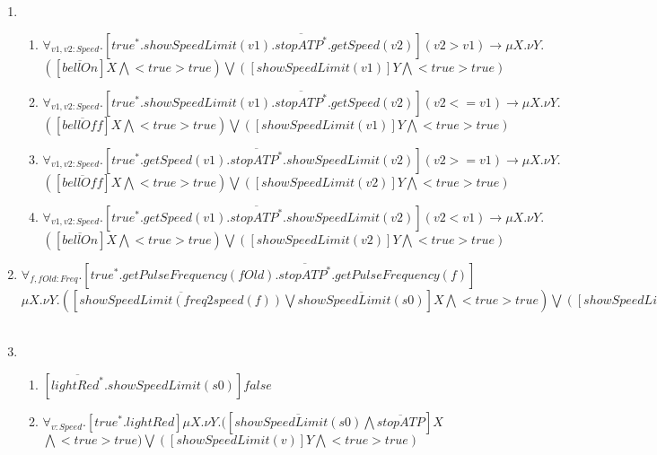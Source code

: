 \documentclass[11pt,a4paper]{article}
\begin{document}
\begin{enumerate}
\item
\begin{enumerate}
\item $\forall _{ v1,v2:Speed} . [true^* . showSpeedLimit(v1) . \overline{stopATP^*} . getSpeed(v2)](v2>v1)\rightarrow \mu X . \nu Y .$
$ ([\overline{bellOn}] X \bigwedge <true> true) \bigvee ([showSpeedLimit(v1)] Y \bigwedge <true> true)$\\
\item $\forall _{ v1,v2:Speed} . [true^* . showSpeedLimit(v1) . \overline{stopATP^*} . getSpeed(v2)](v2<=v1)\rightarrow \mu X . \nu Y .$
$ ([\overline{bellOff}] X \bigwedge <true> true) \bigvee ([showSpeedLimit(v1)] Y \bigwedge <true> true)$\\
\item $\forall _{ v1,v2:Speed} . [true^* . getSpeed(v1) . \overline{stopATP^*} . showSpeedLimit(v2)](v2>=v1)\rightarrow \mu X . \nu Y .$
$ ([\overline{bellOff}] X \bigwedge <true> true) \bigvee ([showSpeedLimit(v2)] Y \bigwedge <true> true)$\\
\item $\forall _{ v1,v2:Speed} . [true^* . getSpeed(v1) . \overline{stopATP^*} . showSpeedLimit(v2)](v2<v1)\rightarrow \mu X . \nu Y .$
$ ([\overline{bellOn}] X \bigwedge <true> true) \bigvee ([showSpeedLimit(v2)] Y \bigwedge <true> true)$\\
\end{enumerate}
\item $\forall _{f,fOld:Freq} . [true^* . getPulseFrequency(fOld) . \overline{stopATP^*} . getPulseFrequency(f)]$\\
$ \mu X . \nu Y . ([\overline{showSpeedLimit(freq2speed(f))} \bigvee \overline{showSpeedLimit(s0)}] X \bigwedge <true> true) \bigvee ([showSpeedLimit(freq2speed(fOld))] Y \bigwedge <true> true)$\\
\\
\item
\begin{enumerate}
\item $[\overline{lightRed^*} . showSpeedLimit(s0)] false$\\
\item $\forall _{v:Speed} . [true^* . lightRed] \mu X . \nu Y .([\overline{showSpeedLimit(s0)} \bigwedge \overline{stopATP}] X$\\
$ \bigwedge <true> true) \bigvee ([showSpeedLimit(v)] Y \bigwedge <true> true)$\\
\\
\end{enumerate}

\end{enumerate}
\end{document}
